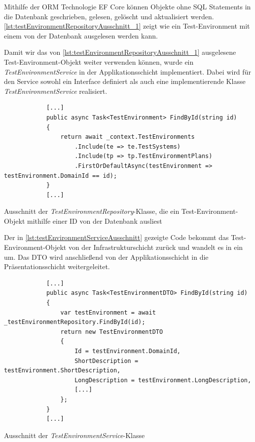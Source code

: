 \documentclass[a4paper, fontsize=11pt, parskip=half, twoside]{scrreprt}
\begin{document}
	Mithilfe der \ac{ORM} Technologie \ac{EF} Core können Objekte ohne \ac{SQL} Statements in die Datenbank geschrieben, gelesen, gelöscht und aktualisiert werden.
	\autoref{lst:testEnvironmentRepositoryAusschnitt_1} zeigt wie ein Test-Environment mit einem  von der Datenbank ausgelesen werden kann.
	
	Damit wir das von \autoref{lst:testEnvironmentRepositoryAusschnitt_1} ausgelesene Test-Environment-Objekt weiter verwenden können, wurde ein \emph{TestEnvironmentService} in der Applikationsschicht implementiert. 
	Dabei wird für den Service sowohl ein Interface definiert als auch eine implementierende Klasse \emph{TestEnvironmentService} realisiert.
	
	\begin{listing}[ht]
		\begin{verbatim}
			[...]		
			public async Task<TestEnvironment> FindById(string id)
			{
				return await _context.TestEnvironments
					.Include(te => te.TestSystems)
					.Include(tp => tp.TestEnvironmentPlans)
					.FirstOrDefaultAsync(testEnvironment => testEnvironment.DomainId == id);		
			}		
			[...]
		\end{verbatim}
		\caption{Ausschnitt der \emph{TestEnvironmentRepository}-Klasse, die ein Test-Environment-Objekt mithilfe einer \ac{ID} von der Datenbank ausliest}
		\label{lst:testEnvironmentRepositoryAusschnitt_1}
	\end{listing}
	
	Der in \autoref{lst:testEnvironmentServiceAusschnitt} gezeigte Code bekommt das Test-Environment-Objekt von der Infrastrukturschicht zurück und wandelt es in ein  um.
	Das \ac{DTO} wird anschließend von der Applikationsschicht in die Präsentationsschicht weitergeleitet.

	\begin{listing}[!htb]
		\begin{verbatim}
			[...]				
			public async Task<TestEnvironmentDTO> FindById(string id)
			{
				var testEnvironment = await _testEnvironmentRepository.FindById(id);	
				return new TestEnvironmentDTO
				{
					Id = testEnvironment.DomainId,
					ShortDescription = testEnvironment.ShortDescription,
					LongDescription = testEnvironment.LongDescription,
					[...]	
				};
			}			
			[...]
		\end{verbatim}
		\caption{Ausschnitt der \emph{TestEnvironmentService}-Klasse}
		\label{lst:testEnvironmentServiceAusschnitt}
	\end{listing}
\end{document}

